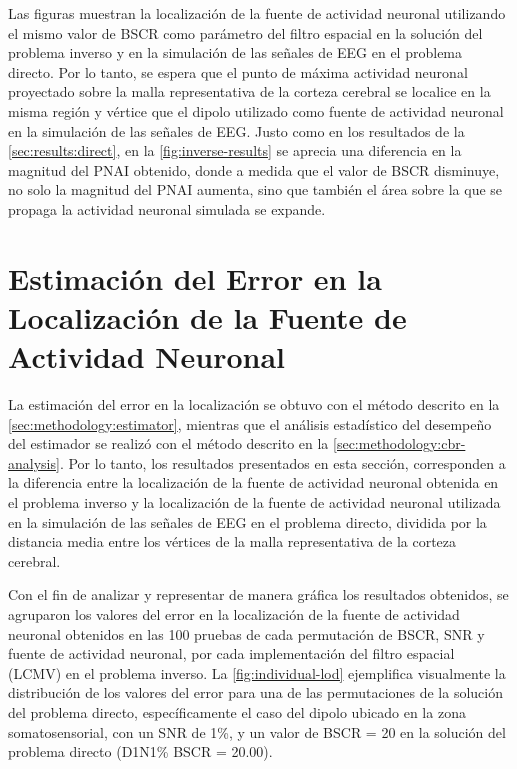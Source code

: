 Las figuras muestran la localización de la fuente de actividad neuronal utilizando el mismo valor de BSCR como parámetro del filtro espacial en la solución del problema inverso y en la simulación de las señales de EEG en el problema directo.
Por lo tanto, se espera que el punto de máxima actividad neuronal proyectado sobre la malla representativa de la corteza cerebral se localice en la misma región y vértice que el dipolo utilizado como fuente de actividad neuronal en la simulación de las señales de EEG.
Justo como en los resultados de la \cref{sec:results:direct}, en la \cref{fig:inverse-results} se aprecia una diferencia en la magnitud del PNAI obtenido, donde a medida que el valor de BSCR disminuye, no solo la magnitud del PNAI aumenta, sino que también el área sobre la que se propaga la actividad neuronal simulada se expande.

\section{Estimación del Error en la Localización de la Fuente de Actividad Neuronal}
\label{sec:results:error}

La estimación del error en la localización se obtuvo con el método descrito en la \cref{sec:methodology:estimator}, mientras que el análisis estadístico del desempeño del estimador se realizó con el método descrito en la \cref{sec:methodology:cbr-analysis}.
Por lo tanto, los resultados presentados en esta sección, corresponden a la diferencia entre la localización de la fuente de actividad neuronal obtenida en el problema inverso y la localización de la fuente de actividad neuronal utilizada en la simulación de las señales de EEG en el problema directo, dividida por la distancia media entre los vértices de la malla representativa de la corteza cerebral.

Con el fin de analizar y representar de manera gráfica los resultados obtenidos, se agruparon los valores del error en la localización de la fuente de actividad neuronal obtenidos en las 100 pruebas de cada permutación de BSCR, SNR y fuente de actividad neuronal, por cada implementación del filtro espacial (LCMV) en el problema inverso. 
La \cref{fig:individual-lod} ejemplifica visualmente la distribución de los valores del error para una de las permutaciones de la solución del problema directo, específicamente el caso del dipolo ubicado en la zona somatosensorial, con un SNR de 1\%, y un valor de BSCR = 20 en la solución del problema directo (D1N1\% BSCR = 20.00).

